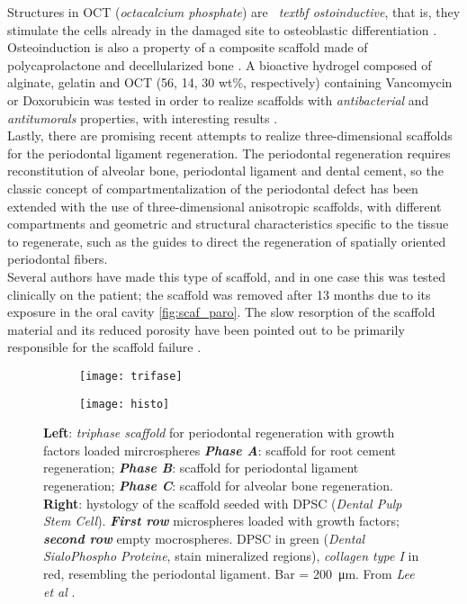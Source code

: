 Structures in OCT (\emph{octacalcium phosphate}) are \emph{\ textbf {ostoinductive}}, that is, they stimulate the cells already in the damaged site to osteoblastic differentiation \parencite{Reference130}. Osteoinduction is also a property of a composite scaffold made of polycaprolactone and decellularized bone \parencite{Reference132}. A bioactive hydrogel composed of alginate, gelatin and OCT (56, 14, 30 wt\%, respectively) containing Vancomycin or Doxorubicin was tested in order to realize scaffolds with \emph{antibacterial} and \emph{antitumorals} properties, with interesting results \parencite{Reference133}. \\
Lastly, there are promising recent attempts to realize three-dimensional scaffolds for the periodontal ligament regeneration. The periodontal regeneration requires reconstitution of alveolar bone, periodontal ligament and dental cement, so the classic concept of compartmentalization of the periodontal defect has been extended with the use of three-dimensional anisotropic scaffolds, with different compartments and geometric and structural characteristics specific to the tissue to regenerate, such as the guides to direct the regeneration of spatially oriented periodontal fibers. \\
Several authors have made this type of scaffold, and in one case this was tested clinically on the patient; the scaffold was removed after 13 months due to its exposure in the oral cavity \ref{fig:scaf_paro}. The slow resorption of the scaffold material and its reduced porosity have been pointed out to be primarily responsible for the scaffold failure \parencite{Reference134}. \\
\begin{figure}[h!]
 
\begin{subfigure}{0.5\textwidth}
\centering
\texttt{[image: trifase]} 
\label{fig:trifase}
\end{subfigure}
\begin{subfigure}{0.5\textwidth}
\centering
\texttt{[image: histo]}
\label{fig:histo}
\end{subfigure}
\caption{\textbf{Left}: \emph{triphase scaffold} for periodontal regeneration with growth factors loaded mircrospheres \emph{\textbf{Phase A}}: scaffold for root cement regeneration; \emph{\textbf{Phase B}}: scaffold for periodontal ligament regeneration; \emph{\textbf{Phase C}}: scaffold for alveolar bone regeneration. \textbf{Right}: hystology of the scaffold seeded with DPSC (\emph{Dental Pulp Stem Cell}). \emph{\textbf{First row}} microspheres loaded with growth factors; \emph{\textbf{second row}} empty mocrospheres. DPSC in green (\emph{Dental SialoPhospho Proteine}, stain mineralized regions), \emph{collagen type I} in red, resembling the periodontal ligament. Bar = \SI {200} {\micro\metre}. From \emph{Lee et al} \parencite{Reference135}.}
\label{fig:scaffold_trifase}
\end{figure}
\pagebreak

